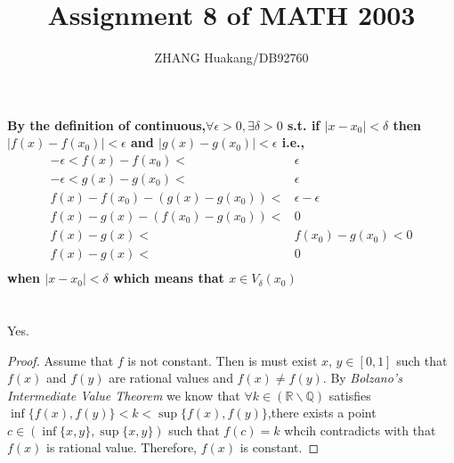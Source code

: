 \documentclass{article}
\title{Assignment 8 of MATH 2003}
\author{ZHANG Huakang/DB92760}
\begin{document}
    \maketitle

    \section{}
        \paragraph{
            By the definition of continuous,$\forall \epsilon >0, \exists \delta >0$ s.t. if $|x-x_0|<\delta$ then $|f(x)-f(x_0)|<\epsilon$ and  $|g(x)-g(x_0)|<\epsilon$ i.e., 
            \begin{equation*}
                \begin{split}
                    -\epsilon<f(x)-f(x_0)<&\epsilon\\
                    -\epsilon<g(x)-g(x_0)<&\epsilon\\
                    f(x)-f(x_0)-(g(x)-g(x_0))<&\epsilon-\epsilon\\
                    f(x)-g(x)-(f(x_0)-g(x_0))<& 0\\
                    f(x)-g(x)<& f(x_0)-g(x_0)<0\\
                    f(x)-g(x)<&0\\
                \end{split}
            \end{equation*}
            when $|x-x_0|<\delta$ which means that $x\in V_\delta(x_0)$
        }
    \section{}
        Yes.
        \begin{proof}
            Assume that $f$ is not constant. Then is must exist $x$, $y\in [0,1]$ such that $f(x)$ and $f(y)$ are rational values and $f(x)\neq f(y)$. By \textit{Bolzano’s Intermediate Value Theorem} we know that $\forall k\in (\mathbb{R}\backslash \mathbb{Q})$ satisfies $\inf\{f(x),f(y)\}<k<\sup\{f(x),f(y)\}$,there exists a point $c\in (\inf\{x,y\},\sup\{x,y\})$ such that $f(c)=k$ whcih contradicts with that $f(x)$ is rational value. Therefore, $f(x)$ is constant.
        \end{proof}
\end{document}

